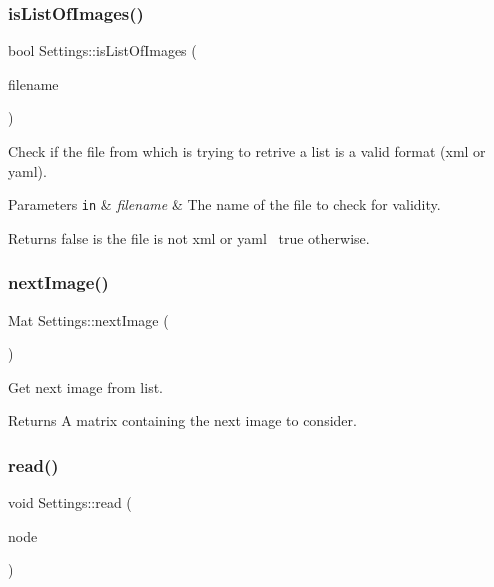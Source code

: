 \subsubsection{\texorpdfstring{is\+List\+Of\+Images()}{isListOfImages()}}
{\footnotesize\ttfamily bool Settings\+::is\+List\+Of\+Images (\begin{DoxyParamCaption}\item[{const string \&}]{filename }\end{DoxyParamCaption})\hspace{0.3cm}{\ttfamily [static]}}



Check if the file from which is trying to retrive a list is a valid format (xml or yaml). 


\begin{DoxyParams}[1]{Parameters}
\mbox{\tt in}  & {\em filename} & The name of the file to check for validity. \\
\hline
\end{DoxyParams}
\begin{DoxyReturn}{Returns}
{\ttfamily false} is the file is not xml or yaml~\newline
 {\ttfamily true} otherwise. 
\end{DoxyReturn}
\mbox{\label{class_settings_a7701462e928f2425b342440fba9973e5}} 
\subsubsection{\texorpdfstring{next\+Image()}{nextImage()}}
{\footnotesize\ttfamily Mat Settings\+::next\+Image (\begin{DoxyParamCaption}{ }\end{DoxyParamCaption})}



Get next image from list. 

\begin{DoxyReturn}{Returns}
A matrix containing the next image to consider. 
\end{DoxyReturn}
\mbox{\label{class_settings_a2d7841f8441095032e0f3b7d20adfd3f}} 
\subsubsection{\texorpdfstring{read()}{read()}}
{\footnotesize\ttfamily void Settings\+::read (\begin{DoxyParamCaption}\item[{const File\+Node \&}]{node }\end{DoxyParamCaption})}




